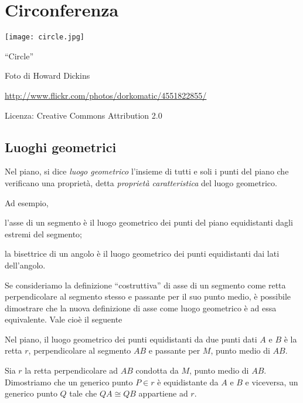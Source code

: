 \chapter{Circonferenza}\label{chap:circonferenza}

\texttt{[image: circle.jpg]}
  \begin{center}
    {\large ``Circle''}\par
    Foto di Howard Dickins\par
    \url{http://www.flickr.com/photos/dorkomatic/4551822855/}\par
    Licenza: Creative Commons Attribution 2.0\par
  \end{center}
\newpage

\section{Luoghi geometrici}

\begin{definizione}
Nel piano, si dice \emph{luogo geometrico} l'insieme di tutti e soli i punti del piano che verificano una proprietà, detta \emph{proprietà caratteristica} del luogo geometrico.
\end{definizione}
Ad esempio,
\begin{itemize*}
\item l'asse di un segmento è il luogo geometrico dei punti del piano equidistanti dagli estremi del segmento;
\item la bisettrice di un angolo è il luogo geometrico dei punti equidistanti dai lati dell'angolo.
\end{itemize*}
Se consideriamo la definizione ``costruttiva'' di asse di un segmento come retta perpendicolare al segmento stesso e passante per il suo punto medio, è possibile dimostrare che la nuova definizione di asse come luogo geometrico è ad essa equivalente.
Vale cioè il seguente
\begin{teorema}
Nel piano, il luogo geometrico dei punti equidistanti da due punti dati $A$ e $B$ è la retta $r$, perpendicolare al segmento $AB$ e passante per $M$, punto medio di $AB$.
\end{teorema}
Sia $r$ la retta perpendicolare ad $AB$ condotta da $M$, punto medio di $AB$. Dimostriamo che un generico punto $P\in r$ è equidistante da $A$ e $B$ e viceversa, un generico punto $Q$ tale che $QA\cong QB$ appartiene ad $r$.
~\\

